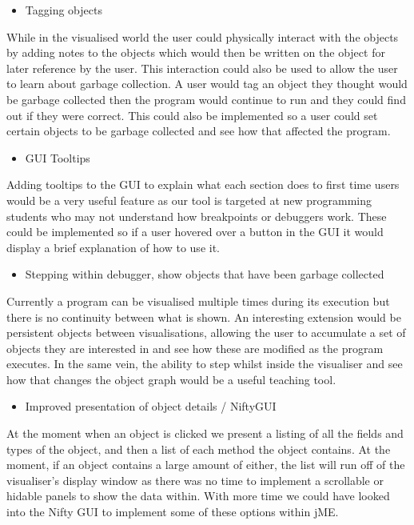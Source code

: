 \documentclass[11pt, a4paper]{report}
\begin{document}
\begin{itemize}
  \item Tagging objects
\end{itemize}

While in the visualised world the user could physically interact with the objects by adding notes to the objects which would then be written on the object for later reference by the user. This interaction could also be used to allow the user to learn about garbage collection. A user would tag an object they thought would be garbage collected then the program would continue to run and they could find out if they were correct. This could also be implemented so a user could set certain objects to be garbage collected and see how that affected the program.

\begin{itemize}
  \item GUI Tooltips
\end{itemize}

Adding tooltips to the GUI to explain what each section does to first time users would be a very useful feature as our tool is targeted at new programming students who may not understand how breakpoints or debuggers work. These could be implemented so if a user hovered over a button in the GUI it would display a brief explanation of how to use it.

\begin{itemize}
  \item Stepping within debugger, show objects that have been garbage collected
\end{itemize}

Currently a program can be visualised multiple times during its execution but there is no continuity between what is shown. An interesting extension would be persistent objects between visualisations, allowing the user to accumulate a set of objects they are interested in and see how these are modified as the program executes. In the same vein, the ability to step whilst inside the visualiser and see how that changes the object graph would be a useful teaching tool.

\begin{itemize}
  \item Improved presentation of object details / NiftyGUI
\end{itemize}

At the moment when an object is clicked we present a listing of all the fields and types of the object, and then a list of each method the object contains. At the moment, if an object contains a large amount of either, the list will run off of the visualiser’s display window as there was no time to implement a scrollable or hidable panels to show the data within. With more time we could have looked into the Nifty GUI to implement some of these options within jME.
\end{document}
